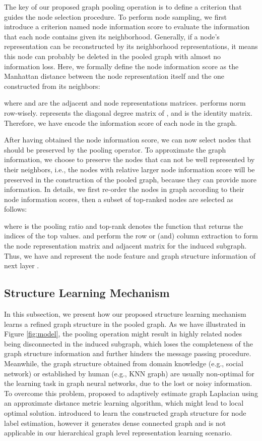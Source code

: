 \documentclass[letterpaper]{article} \usepackage{aaai20}  \usepackage{times}  \usepackage{helvet} \usepackage{courier}  \usepackage[hyphens]{url}  \usepackage{graphicx} \urlstyle{rm} \def\UrlFont{\rm}  \usepackage{graphicx}  \frenchspacing  \setlength{\pdfpagewidth}{8.5in}  \setlength{\pdfpageheight}{11in}
\begin{document}
The key of our proposed graph pooling operation is to define a criterion that guides the node selection procedure. To perform node sampling, we first introduce a criterion named node information score to evaluate the information that each node contains given its neighborhood. Generally, if a node's representation can be reconstructed by its neighborhood representations, it means this node can probably be deleted in the pooled graph with almost no information loss. Here, we formally define the node information score as the Manhattan distance between the node representation itself and the one constructed from its neighbors:
  
where  and  are the adjacent and node representations matrices.  performs  norm row-wisely.  represents the diagonal degree matrix of , and  is the identity matrix. Therefore, we have  encode the information score of each node in the graph.

After having obtained the node information score, we can now select nodes that should be preserved by the pooling operator. To approximate the graph information, we choose to preserve the nodes that can not be well represented by their neighbors, i.e., the nodes with relative larger node information score will be preserved in the construction of the pooled graph, because they can provide more information. In details, we first re-order the nodes in graph according to their node information scores, then a subset of top-ranked nodes are selected as follows:

where  is the pooling ratio and top-rank denotes the function that returns the indices of the top  values.  and  perform the row or (and) column extraction to form the node representation matrix and adjacent matrix for the induced subgraph. Thus, we have  and  represent the node feature and graph structure information of next layer .

\subsection{Structure Learning Mechanism}
In this subsection, we present how our proposed structure learning mechanism learns a refined graph structure in the pooled graph. As we have illustrated in Figure \ref{fig:model}, the pooling operation might result in highly related nodes being disconnected in the induced subgraph, which loses the completeness of the graph structure information and further hinders the message passing procedure. Meanwhile, the graph structure obtained from domain knowledge (e.g., social network) or established by human (e.g., KNN graph) are usually non-optimal for the learning task in graph neural networks, due to the lost or noisy information. To overcome this problem, \cite{li2018adaptive} proposed to adaptively estimate graph Laplacian using an approximate distance metric learning algorithm, which might lead to local optimal solution. \cite{jiang2019semi} introduced to learn the constructed graph structure for node label estimation, however it generates dense connected graph and is not applicable in our hierarchical graph level representation learning scenario. 
\end{document}
